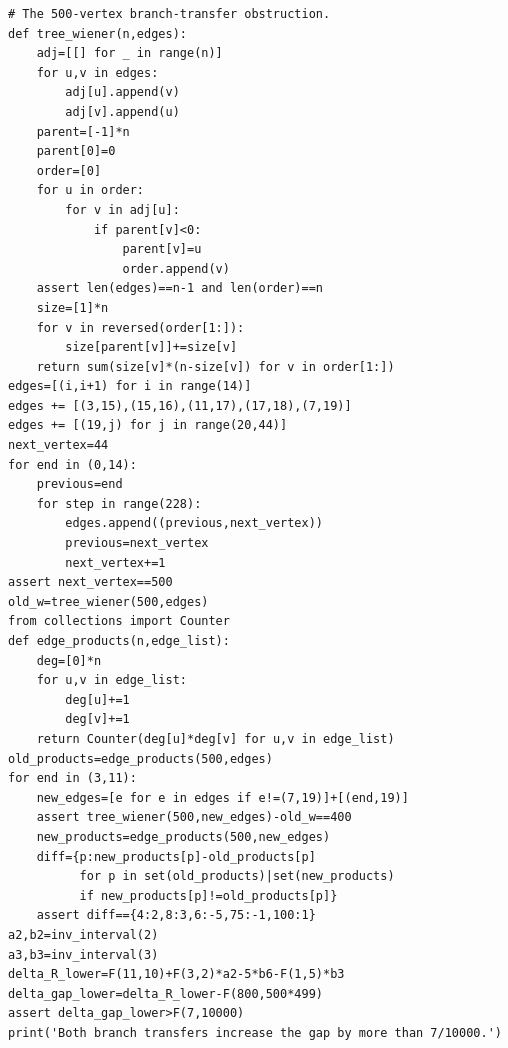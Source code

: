 \documentclass[11pt,a4paper]{article}
\theoremstyle{remark}\newtheorem{remark}[theorem]{Remark}
\begin{document}
\begin{lstlisting}
# The 500-vertex branch-transfer obstruction.
def tree_wiener(n,edges):
    adj=[[] for _ in range(n)]
    for u,v in edges:
        adj[u].append(v)
        adj[v].append(u)
    parent=[-1]*n
    parent[0]=0
    order=[0]
    for u in order:
        for v in adj[u]:
            if parent[v]<0:
                parent[v]=u
                order.append(v)
    assert len(edges)==n-1 and len(order)==n
    size=[1]*n
    for v in reversed(order[1:]):
        size[parent[v]]+=size[v]
    return sum(size[v]*(n-size[v]) for v in order[1:])
edges=[(i,i+1) for i in range(14)]
edges += [(3,15),(15,16),(11,17),(17,18),(7,19)]
edges += [(19,j) for j in range(20,44)]
next_vertex=44
for end in (0,14):
    previous=end
    for step in range(228):
        edges.append((previous,next_vertex))
        previous=next_vertex
        next_vertex+=1
assert next_vertex==500
old_w=tree_wiener(500,edges)
from collections import Counter
def edge_products(n,edge_list):
    deg=[0]*n
    for u,v in edge_list:
        deg[u]+=1
        deg[v]+=1
    return Counter(deg[u]*deg[v] for u,v in edge_list)
old_products=edge_products(500,edges)
for end in (3,11):
    new_edges=[e for e in edges if e!=(7,19)]+[(end,19)]
    assert tree_wiener(500,new_edges)-old_w==400
    new_products=edge_products(500,new_edges)
    diff={p:new_products[p]-old_products[p]
          for p in set(old_products)|set(new_products)
          if new_products[p]!=old_products[p]}
    assert diff=={4:2,8:3,6:-5,75:-1,100:1}
a2,b2=inv_interval(2)
a3,b3=inv_interval(3)
delta_R_lower=F(11,10)+F(3,2)*a2-5*b6-F(1,5)*b3
delta_gap_lower=delta_R_lower-F(800,500*499)
assert delta_gap_lower>F(7,10000)
print('Both branch transfers increase the gap by more than 7/10000.')

\end{lstlisting}
\end{document}
